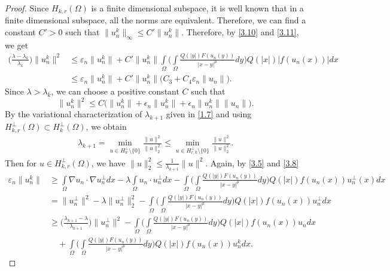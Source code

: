 \documentclass[11pt]{amsart}
\numberwithin{equation}{section}
\newcommand{\1}{\frac{1}{2}}
\begin{document}
\begin{proof}
		Since $H_{k,r}(\Omega)$ is a finite dimensional subspace, it is well known that in a finite dimensional subspace, all the norms are equivalent. Therefore, we can find a constant $C'>0$ such that $\|u_n^k\|_\infty \leq C'\|u_n^k\|$.  Therefore, by \eqref{3.10} and \eqref{3.11}, we get
		\begin{align}
			\Bigg(\frac{\lambda -\lambda_k}{\lambda_k}\Bigg) \|u_n^k\|^2 &\leq \varepsilon_n\|u_n^k\| + C' \|u_n^k\| \int\limits_\Omega \Bigg( \int\limits_\Omega \frac{Q(|y|)F(u_n(y))}{|x-y|^\mu} dy\Bigg) Q(|x|)|f(u_n(x))| dx \nonumber\\
			& \leq \varepsilon_n\|u_n^k\| + C' \|u_n^k\| \big(C_3 + C_4 \varepsilon_n \|u_n\| \big). \nonumber
		\end{align}
		Since $\lambda > \lambda_k$, we can choose a positive constant $C$ such that
		\begin{equation}
			\|u_n^k\|^2 \leq C \big( \|u_n^k\| + \epsilon_n\|u_n^k\|+ \epsilon_n \|u_n^k\| \|u_n\| \big). \label{3.12}
		\end{equation}
		By the variational characterization of $\lambda_{k+1}$ given in \eqref{1.7} and using $H_{k,r}^\perp(\Omega) \subset H_k^\perp(\Omega)$, we obtain 
		\begin{align*}
			\lambda_{k+1} = \min_{u\in H_k^\perp \setminus \{0\}} \frac{\|u\|^2}{\|u\|^2_2} \leq \min_{u\in H_{r,k}^\perp \setminus \{0\}} \frac{\|u\|^2}{\|u\|^2_2}.
		\end{align*}
		Then for $u\in H_{k,r}^\perp(\Omega)$, we have $\displaystyle\|u\|_2^2 \leq \frac{1}{\lambda_{k+1}} \|u\|^2$. Again, by \eqref{3.5} and \eqref{3.8}   
		\begin{align}
			\varepsilon_n\|u_n^k\| &\geq \int\limits_\Omega \nabla u_n \cdot \nabla u_n^\perp dx - \lambda \int\limits_\Omega u_n \cdot u_n^\perp dx - \int\limits_\Omega \Bigg( \int\limits_\Omega \frac{Q(|y|)F(u_n(y))}{|x-y|^\mu} dy\Bigg) Q(|x|)f(u_n(x)) u_n^\perp(x) dx \nonumber\\
			& = \|u^\perp_n\|^2 - \lambda \|u^\perp_n\|^2_2 - \int\limits_\Omega \Bigg( \int\limits_\Omega \frac{Q(|y|)F(u_n(y))}{|x-y|^\mu} dy\Bigg) Q(|x|)f(u_n(x)) u_n^\perp dx  \nonumber\\
			& \geq \Bigg(\frac{\lambda_{k+1} -\lambda}{\lambda_{k+1}}\Bigg) \|u_n^\perp\|^2 - \int\limits_\Omega \Bigg( \int\limits_\Omega \frac{Q(|y|)F(u_n(y))}{|x-y|^\mu} dy\Bigg) Q(|x|)f(u_n(x)) u_n dx \nonumber\\
			& \quad+ \int\limits_\Omega \Bigg( \int\limits_\Omega \frac{Q(|y|)F(u_n(y))}{|x-y|^\mu} dy\Bigg) Q(|x|)f(u_n(x)) u_n^k dx. \nonumber

\end{align}
\end{proof}
\end{document}
